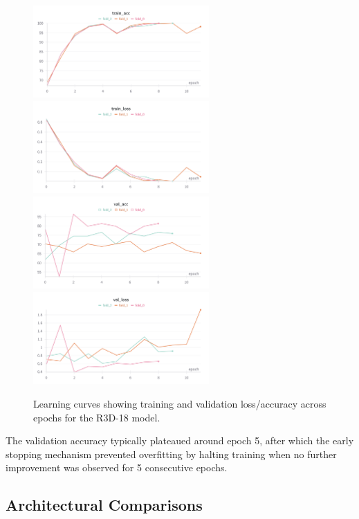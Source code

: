 \documentclass[12pt, a4paper]{article}
\begin{document}
\begin{figure}[htbp]
  \centering
  \includegraphics[width=0.6\textwidth]{figures/3f_train_acc.png}
  \includegraphics[width=0.6\textwidth]{figures/3f_train_loss.png}
  \includegraphics[width=0.6\textwidth]{figures/3f_val_acc.png}
  \includegraphics[width=0.6\textwidth]{figures/3f_val_loss.png}
  \caption{Learning curves showing training and validation loss/accuracy across epochs for the R3D-18 model.}
  \label{fig:learning_curves}
\end{figure}

The validation accuracy typically plateaued around epoch 5, after which the early stopping mechanism prevented overfitting by halting training when no further improvement was observed for 5 consecutive epochs.

\subsection{Architectural Comparisons}
\end{document}
